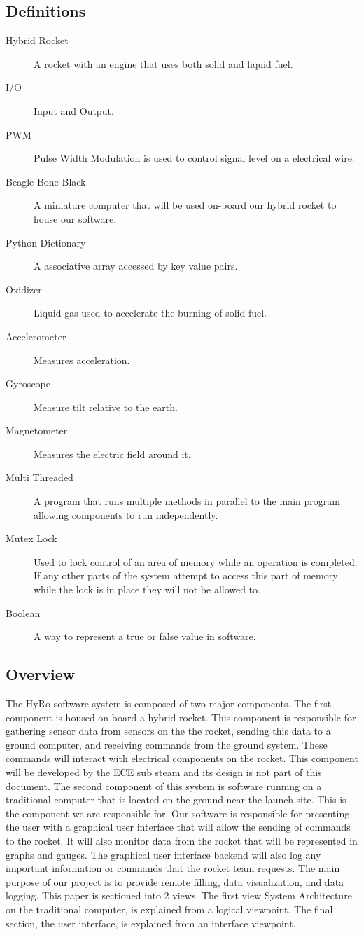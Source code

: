 \documentclass[10pt,draftclsnofoot,onecolumn,compsoc]{IEEEtran}
\begin{document}
\subsection{Definitions}
\begin{description}
	\item[Hybrid Rocket] A rocket with an engine that uses both solid and liquid fuel.
	\item[I/O] Input and Output.
	\item[PWM] Pulse Width Modulation is used to control signal level on a electrical wire.
	\item[Beagle Bone Black] A miniature computer that will be used on-board our hybrid rocket to house our software.
	\item[Python Dictionary] A associative array accessed by key value pairs.
	\item[Oxidizer] Liquid gas used to accelerate the burning of solid fuel.
	\item[Accelerometer] Measures acceleration.
	\item[Gyroscope] Measure tilt relative to the earth.
	\item[Magnetometer] Measures the electric field around it.
	\item[Multi Threaded] A program that runs multiple methods in parallel to the main program allowing components to run independently.
	\item[Mutex Lock] Used to lock control of an area of memory while an operation is completed. If any other parts of the system attempt to access this part of memory while the lock is in place they will not be allowed to.
	\item[Boolean] A way to represent a true or false value in software.
\end{description}
\subsection{Overview}
The HyRo software system is composed of two major components. The first component is housed on-board a hybrid rocket. This component is responsible for gathering sensor data from sensors on the the rocket, sending this data to a ground computer, and receiving commands from the ground system. These commands will interact with electrical components on the rocket. This component will be developed by the ECE sub steam and its design is not part of this document. The second component of this system is software running on a traditional computer that is located on the ground near the launch site. This is the component we are responsible for. Our software is responsible for presenting the user with a graphical user interface that will allow the sending of commands to the rocket. It will also monitor data from the rocket that will be represented in graphs and gauges. The graphical user interface backend will also log any important information or commands that the rocket team requests. The main purpose of our project is to provide remote filling, data visualization, and data logging. This paper is sectioned into 2 views. The first view System Architecture on the traditional computer, is explained from a logical viewpoint. The final section, the user interface, is explained from an interface viewpoint.
\end{document}
